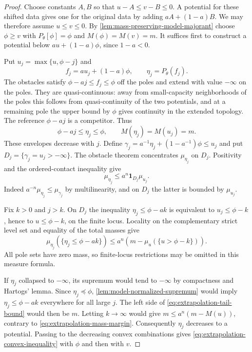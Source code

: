 \begin{proof}
Choose constants $A,B$ so that $u-A\leq v-B\leq0$. A potential for these shifted data gives one for the original data by adding $aA+(1-a)B$. We may therefore assume $u\leq v\leq0$. By \cref{lem:mass-preserving-model-majorant} choose $\phi\geq v$ with $P_\theta[\phi]=\phi$ and $M(\phi)=M(v)=m$. It suffices first to construct a potential below $a u+(1-a)\phi$, since $1-a<0$.

Put $u_j=\max\{u,\phi-j\}$ and
\[
 f_j=a u_j+(1-a)\phi,\qquad \eta_j=P_\theta(f_j).
\]
The obstacles satisfy $\phi-a j\leq f_j\leq\phi$ off the poles and extend with value $-\infty$ on the poles. They are quasi-continuous: away from small-capacity neighborhoods of the poles this follows from quasi-continuity of the two potentials, and at a remaining pole the upper bound by $\phi$ gives continuity in the extended topology. The reference $\phi-a j$ is a competitor. Thus
\[
 \phi-a j\leq\eta_j\leq\phi,\qquad M(\eta_j)=M(u_j)=m.
\]
These envelopes decrease with $j$. Define $\gamma_j=a^{-1}\eta_j+(1-a^{-1})\phi\leq u_j$ and put $D_j=\{\gamma_j=u_j>-\infty\}$. The obstacle theorem concentrates $\mu_{\eta_j}$ on $D_j$. Positivity and the ordered-contact inequality give
\begin{equation}\label{eq:extrapolation-contact-bound}
 \mu_{\eta_j}\leq a^n\mathbf1_{D_j}\mu_{u_j}.
\end{equation}
Indeed $a^{-n}\mu_{\eta_j}\leq\mu_{\gamma_j}$ by multilinearity, and on $D_j$ the latter is bounded by $\mu_{u_j}$.

Fix $k>0$ and $j>k$. On $D_j$ the inequality $\eta_j\leq\phi-a k$ is equivalent to $u_j\leq\phi-k$, hence to $u\leq\phi-k$, on the finite locus. Locality on the complementary strict level set and equality of the total masses give
\begin{equation}\label{eq:extrapolation-tail-bound}
 \mu_{\eta_j}(\{\eta_j\leq\phi-a k\})
 \leq a^n\left(m-\mu_u(\{u>\phi-k\})\right).
\end{equation}
All pole sets have zero mass, so finite-locus restrictions may be omitted in this measure formula.

If $\eta_j$ collapsed to $-\infty$, its supremum would tend to $-\infty$ by compactness and Hartogs' lemma. Since $\eta_j\preceq\phi$, \cref{lem:model-normalized-supremum} would imply $\eta_j\leq\phi-a k$ everywhere for all large $j$. The left side of \eqref{eq:extrapolation-tail-bound} would then be $m$. Letting $k\to\infty$ would give
$m\leq a^n(m-M(u))$, contrary to \eqref{eq:extrapolation-mass-margin}. Consequently $\eta_j$ decreases to a potential. Passing to the decreasing convex combinations gives \eqref{eq:extrapolation-convex-inequality} with $\phi$ and then with $v$.


\end{proof}
